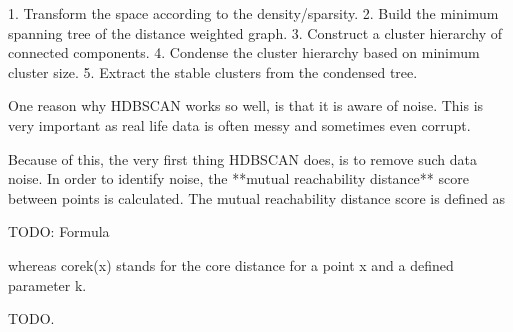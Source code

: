 1. Transform the space according to the density/sparsity.
2. Build the minimum spanning tree of the distance weighted graph.
3. Construct a cluster hierarchy of connected components.
4. Condense the cluster hierarchy based on minimum cluster size.
5. Extract the stable clusters from the condensed tree.

One reason why HDBSCAN works so well, is that it is aware of noise.
This is very important as real life data is often messy and sometimes even corrupt.

Because of this, the very first thing HDBSCAN does, is to remove such data noise.
In order to identify noise, the **mutual reachability distance** score between
points is calculated. The mutual reachability distance score is defined as

TODO: Formula

whereas corek(x) stands for the core distance for a point x and a defined parameter k.

TODO.
